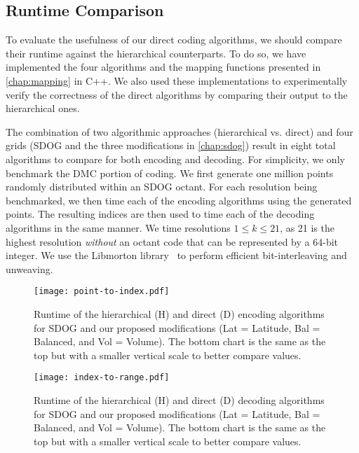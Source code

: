 \subsection{Runtime Comparison}
To evaluate the usefulness of our direct coding algorithms, we should compare their runtime against the hierarchical counterparts.
To do so, we have implemented the four algorithms and the mapping functions presented in \cref{chap:mapping} in C++.
We also used these implementations to experimentally verify the correctness of the direct algorithms by comparing their output to the hierarchical ones.


The combination of two algorithmic approaches (hierarchical vs. direct) and four grids (SDOG and the three modifications in \cref{chap:sdog}) result in eight total algorithms to compare for both encoding and decoding.
For simplicity, we only benchmark the DMC portion of coding.
We first generate one million points randomly distributed within an SDOG octant.
For each resolution being benchmarked, we then time each of the encoding algorithms using the generated points.
The resulting indices are then used to time each of the decoding algorithms in the same manner.
We time resolutions $1 \le k \le 21$, as 21 is the highest resolution \textit{without} an octant code that can be represented by a 64-bit integer.
We use the Libmorton library~\cite{libmorton18} to perform efficient bit-interleaving and unweaving.


\begin{figure}[htp!]
	\centering
	\texttt{[image: point-to-index.pdf]}
	\caption[Runtime comparison of SDOG point encoding algorithms]{
		Runtime of the hierarchical (H) and direct (D) encoding algorithms for SDOG and our proposed modifications (Lat = Latitude, Bal = Balanced, and Vol = Volume).
		The bottom chart is the same as the top but with a smaller vertical scale to better compare values.
	}
	\label{fig:point-to-index}
\end{figure}


\begin{figure}[htp!]
	\centering
	\texttt{[image: index-to-range.pdf]}
	\caption[Runtime comparison of SDOG decoding algorithms]{
		Runtime of the hierarchical (H) and direct (D) decoding algorithms for SDOG and our proposed modifications (Lat = Latitude, Bal = Balanced, and Vol = Volume).
		The bottom chart is the same as the top but with a smaller vertical scale to better compare values.
	}
	\label{fig:index-to-range}
\end{figure}


